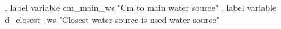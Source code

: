 . label variable cm_main_ws "Cm to main water source"
{\smallskip}
. label variable d_closest_ws "Closest water source is used water source" 
{\smallskip}
